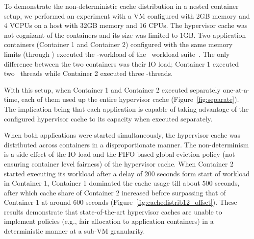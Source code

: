To demonstrate the non-deterministic cache distribution in a nested 
container setup, we performed an experiment with a VM configured 
with 2GB memory and 4 VCPUs on a host with 32GB memory and 16 CPUs.
%
The hypervisor cache 
was not cognizant of the containers and its size was limited to 1GB.
%
%
Two application containers (Container 1 and Container 2) configured with 
the same memory limits (through \cgroup) executed the \web-workload of the 
\file~workload suite~\cite{filebench}.
%
The only difference between the two containers was their IO load; 
Container 1 executed two
\web~threads while Container 2 executed three \web-threads.
%

With this setup, when Container 1 and Container 2 executed separately one-at-a-time, 
each of them used up the entire hypervisor cache (Figure~\ref{fig:separate}).
%
The implication being that each application is capable of taking advantage 
of the configured hypervisor cache to its capacity when executed separately.
%
%

When both applications were started simultaneously,
the hypervisor
cache was distributed across containers in a disproportionate manner.
%
%
The non-determinism is a side-effect of the IO load and
the FIFO-based global eviction policy (not ensuring container level fairness) 
of the hypervisor cache.
%
When Container 2 started executing its  workload after a delay of 200 seconds 
form start of workload in Container 1,
%
Container 1 dominated the cache usage till about 500 seconds, after which
cache share of Container 2 increased before surpassing that of 
Container 1 at around 600 seconds (Figure~\ref{fig:cachedistrib12_offset}).
%
%
These results demonstrate that state-of-the-art hypervisor caches are unable to
implement policies (e.g., fair allocation to application containers) in a 
deterministic manner at a sub-VM granularity.
%


